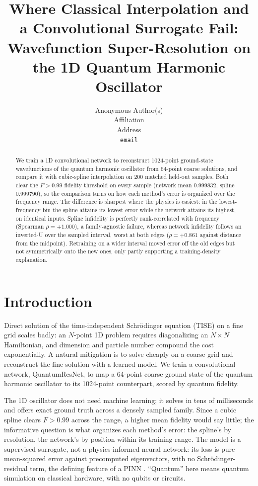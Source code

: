 \documentclass{article}
\title{Where Classical Interpolation and a Convolutional Surrogate Fail:
Wavefunction Super-Resolution on the 1D Quantum Harmonic Oscillator}
\author{%
  Anonymous Author(s) \\
  Affiliation \\
  Address \\
  \texttt{email} \\
}
\begin{document}
\maketitle

\begin{abstract}
We train a 1D convolutional network to reconstruct 1024-point
ground-state wavefunctions of the quantum harmonic oscillator from 64-point
coarse solutions, and compare it with cubic-spline interpolation on 200 matched
held-out samples. Both clear the $F > 0.99$ fidelity threshold on every sample
(network mean 0.999832, spline 0.999790), so the comparison turns on how each
method's error is organized over the frequency range. The difference is sharpest
where the physics is easiest: in the lowest-frequency bin the spline attains its
lowest error while the network attains its highest, on identical inputs. Spline infidelity is perfectly
rank-correlated with frequency (Spearman $\rho = +1.000$), a family-agnostic
failure, whereas network infidelity follows an inverted-U over the sampled
interval, worst at both edges ($\rho = +0.861$ against distance from the
midpoint). Retraining on a wider interval moved error off the old edges but not
symmetrically onto the new ones, only partly supporting a training-density
explanation.
\end{abstract}

\section{Introduction}

Direct solution of the time-independent Schr\"odinger equation (TISE) on a fine
grid scales badly: an $N$-point 1D problem requires diagonalizing an $N \times N$
Hamiltonian, and dimension and particle number compound the cost exponentially. A
natural mitigation is to solve cheaply on a coarse grid and reconstruct the fine
solution with a learned model. We train a convolutional network, QuantumResNet,
to map a 64-point coarse ground state of the quantum harmonic oscillator to its
1024-point counterpart, scored by quantum fidelity.

The 1D oscillator does not need machine learning; it solves in tens of
milliseconds and offers exact ground truth across a densely sampled family. Since
a cubic spline clears $F > 0.99$ across the range, a higher mean fidelity would
say little; the informative question is what organizes each method's error: the
spline's by resolution, the network's by position within its training range. The model is a supervised
surrogate, not a physics-informed neural network: its loss is pure mean-squared
error against precomputed eigenvectors, with no Schr\"odinger-residual term, the
defining feature of a PINN \citep{raissi2019}. ``Quantum'' here means quantum
simulation on classical hardware, with no qubits or circuits.
\end{document}

